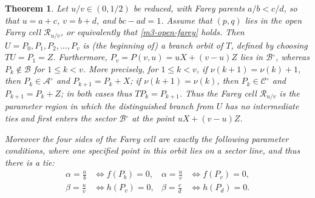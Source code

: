 \documentclass[11pt,reqno,tbtags,a4paper]{amsart}
\numberwithin{equation}{section}
\renewcommand\le{\leq}
\renewcommand\leq{\leqslant}
\theoremstyle{plain}%
\newtheorem{theorem}{Theorem}[section]
\theoremstyle{definition}
\theoremstyle{remark}
\newcounter{cases}
\newcommand\inter{\ensuremath{^\circ}}
\newcommand\cA{\mathcal A}
\newcommand\cB{\mathcal B}
\newcommand\cC{\mathcal C}
\newcommand\cR{{\mathcal R}}
\newcommand\0{{\boldsymbol 0}}
\newcommand\1{{\boldsymbol 1}}
\begin{document}
\begin{theorem}%
\label{Tm3-Farey-entry}
Let $u/v\in(0,1/2)$ be reduced, with Farey parents $a/b<c/d$, so that
$u=a+c$, $v=b+d$, and $bc-ad=1$.  
Assume that $(p,q)$ lies in the open Farey cell
$\cR_{u/v}$, or equivalently that \eqref{m3-open-farey} holds.
Then $U=P_0,P_1,P_2,\dots,P_v$ is (the beginning of) a branch orbit of $T$, 
defined by choosing $TU=P_1=Z$.
Furthermore, 
$P_v=P(v,u)=uX+(v-u)Z$ lies in $\cB\inter$, whereas $P_k\notin\cB$ for
$1\le k<v$.  More precisely, for $1\le k<v$,
if $\nu(k+1)=\nu(k)+1$, then
$P_k\in\cA\inter$ and $P_{k+1}=P_k+X$; if $\nu(k+1)=\nu(k)$, then
$P_k\in\cC\inter$ and $P_{k+1}=P_k+Z$; in both cases thus $TP_k=P_{k+1}$.
Thus the Farey cell 
$\cR_{u/v}$
is the parameter region in which the distinguished branch
from $U$ has no intermediate ties and first enters the sector $\cB\inter$
at the point $uX+(v-u)Z$.

Moreover the four sides of the Farey
cell are exactly the following parameter conditions, where one specified
point in this orbit
lies on a sector line, and thus there is a tie:
\begin{equation}
\begin{aligned}\label{ele1}
        \alpha=\frac ab &\Longleftrightarrow f(P_b)=0, &
        \alpha=\frac uv &\Longleftrightarrow f(P_v)=0,\\
        \beta =\frac uv &\Longleftrightarrow h(P_v)=0, &
        \beta =\frac cd &\Longleftrightarrow h(P_d)=0.
\end{aligned}
\end{equation}
\end{theorem}
\end{document}
